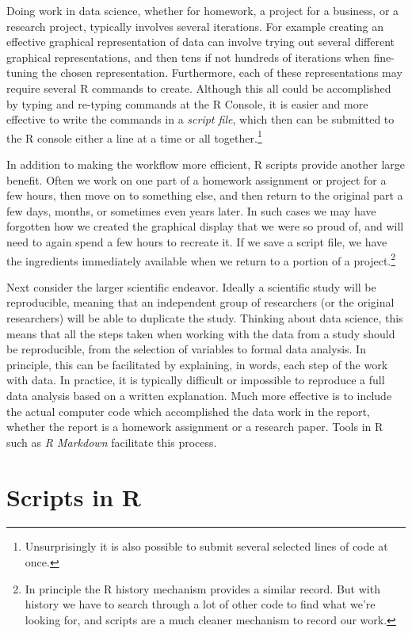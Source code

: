 \documentclass[]{krantz}
\begin{document}
Doing work in data science, whether for homework, a project for a business, or a research project, typically involves several iterations. For example creating an effective graphical representation of data can involve trying out several different graphical representations, and then tens if not hundreds of iterations when fine-tuning the chosen representation. Furthermore, each of these representations may require several R commands to create. Although this all could be accomplished by typing and re-typing commands at the R Console, it is easier and more effective to write the commands in a \emph{script file}, which then can be submitted to the R console either a line at a time or all together.\footnote{Unsurprisingly it is also possible to submit several selected lines of code at once.}

In addition to making the workflow more efficient, R scripts provide another large benefit. Often we work on one part of a homework assignment or project for a few hours, then move on to something else, and then return to the original part a few days, months, or sometimes even years later. In such cases we may have forgotten how we created the graphical display that we were so proud of, and will need to again spend a few hours to recreate it. If we save a script file, we have the ingredients immediately available when we return to a portion of a project.\footnote{In principle the R history mechanism provides a similar record. But with history we have to search through a lot of other code to find what we're looking for, and scripts are a much cleaner mechanism to record our work.}

Next consider the larger scientific endeavor. Ideally a scientific study will be reproducible, meaning that an independent group of researchers (or the original researchers) will be able to duplicate the study. Thinking about data science, this means that all the steps taken when working with the data from a study should be reproducible, from the selection of variables to formal data analysis. In principle, this can be facilitated by explaining, in words, each step of the work with data. In practice, it is typically difficult or impossible to reproduce a full data analysis based on a written explanation. Much more effective is to include the actual computer code which accomplished the data work in the report, whether the report is a homework assignment or a research paper. Tools in R such as \emph{R Markdown} facilitate this process.

\hypertarget{scripts-in-r}{%
\section{Scripts in R}\label{scripts-in-r}}
\end{document}

